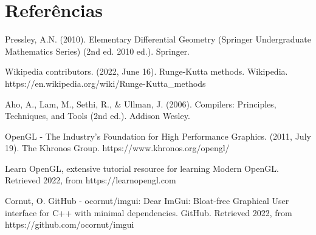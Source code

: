 \documentclass[10pt,a4paper]{article}
\begin{document}
\newpage
\section*{Referências}

Pressley, A.N. (2010). Elementary Differential Geometry
(Springer Undergraduate Mathematics Series) (2nd ed. 2010 ed.).
Springer.

Wikipedia contributors. (2022, June 16). Runge-Kutta methods.
Wikipedia. https://en.wikipedia.org/wiki/Runge-Kutta\_methods

Aho, A., Lam, M., Sethi, R., \& Ullman, J. (2006). Compilers:
Principles, Techniques, and Tools (2nd ed.). Addison Wesley.

OpenGL - The Industry’s Foundation for High Performance Graphics.
(2011, July 19). The Khronos Group. https://www.khronos.org/opengl/

Learn OpenGL, extensive tutorial resource for learning Modern OpenGL.
Retrieved 2022, from https://learnopengl.com

Cornut, O. GitHub - ocornut/imgui: Dear ImGui: Bloat-free Graphical User interface
for C++ with minimal dependencies.
GitHub. Retrieved 2022, from https://github.com/ocornut/imgui
\end{document}

